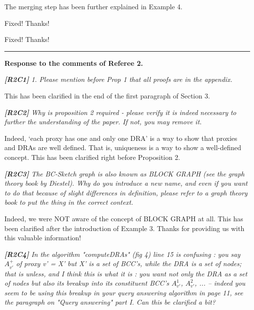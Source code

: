 \documentclass[11pt]{letter}
\newcommand{\vs}{\vspace{1ex}}
\newcommand{\svs}{\vspace{0.36ex}}
\begin{document}
\svs

The merging step has been further explained in Example 4.

\svs

Fixed! Thanks!

\svs


Fixed! Thanks!



\vspace{2.8ex}
\hrule
\vspace{0.6ex}
{\bf Response to the comments of Referee 2.}



\vs
\noindent
{\em
{\bf [R2C1]}
1. Please mention before Prop 1 that all proofs are in the appendix.}
\svs

This has been clarified in the end of the first paragraph of Section 3.

\vs
\noindent
{\em
{\bf [R2C2]} Why is proposition 2 required - please verify it is indeed necessary to further the understanding of the paper. If not, you may remove it.}
\svs

Indeed, `each proxy has one and only one DRA' is a way to show that proxies and DRAs are well defined. That is, uniqueness is a way to show a well-defined concept. This has been clarified right before Proposition 2.

\vs
\noindent
{\em
{\bf [R2C3]} The BC-Sketch graph is also known as BLOCK GRAPH (see the graph theory book by Diestel). Why do you introduce a new name, and even if you want to do that because of slight differences in definition, please refer to a graph theory book to put the thing in the correct context.}
\svs

Indeed, we were NOT aware of the concept of BLOCK GRAPH at all. This has been clarified after the introduction of Example 3. Thanks for providing us with this valuable information!


\vs
\noindent
{\em{\bf[R2C4]}  In the algorithm "computeDRAs" (fig 4) line 15 is confusing : you say $A^+_{v'}$ of proxy v' = X' but X' is a set of BCC's, while the DRA is a set of nodes; that is unless, and I think this is what it is : you want not only the DRA as a set of nodes but also its breakup into its constituent BCC's $A^1_{v'}$, $A^2_{v'}$, ... -- indeed you seem to be using this breakup in your query answering algorithm in page 11, see the paragraph on "Query answering" part I. Can this be clarified a bit?}
\svs
\end{document}

